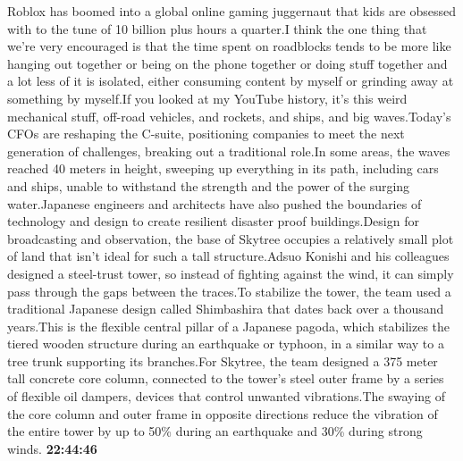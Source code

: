 \documentclass{article}%
\begin{document}
Roblox has boomed into a global online gaming juggernaut that kids are obsessed with to the tune of 10 billion plus hours a quarter.I think the one thing that we're very encouraged is that the time spent on roadblocks tends to be more like hanging out together or being on the phone together or doing stuff together and a lot less of it is isolated, either consuming content by myself or grinding away at something by myself.If you looked at my YouTube history, it's this weird mechanical stuff, off{-}road vehicles, and rockets, and ships, and big waves.Today's CFOs are reshaping the C{-}suite, positioning companies to meet the next generation of challenges, breaking out a traditional role.In some areas, the waves reached 40 meters in height, sweeping up everything in its path, including cars and ships, unable to withstand the strength and the power of the surging water.Japanese engineers and architects have also pushed the boundaries of technology and design to create resilient disaster proof buildings.Design for broadcasting and observation, the base of Skytree occupies a relatively small plot of land that isn't ideal for such a tall structure.Adsuo Konishi and his colleagues designed a steel{-}trust tower, so instead of fighting against the wind, it can simply pass through the gaps between the traces.To stabilize the tower, the team used a traditional Japanese design called Shimbashira that dates back over a thousand years.This is the flexible central pillar of a Japanese pagoda, which stabilizes the tiered wooden structure during an earthquake or typhoon, in a similar way to a tree trunk supporting its branches.For Skytree, the team designed a 375 meter tall concrete core column, connected to the tower's steel outer frame by a series of flexible oil dampers, devices that control unwanted vibrations.The swaying of the core column and outer frame in opposite directions reduce the vibration of the entire tower by up to 50\% during an earthquake and 30\% during strong winds.%
\textbf{22:44:46}%
\newline%
\end{document}
